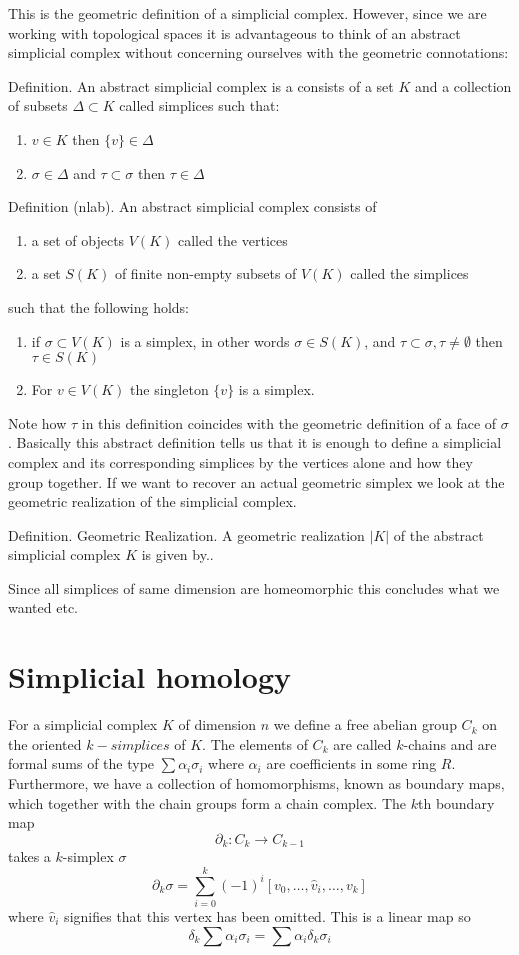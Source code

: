 This is the geometric definition of a simplicial complex. However, since we are working with topological spaces it is advantageous to think of an abstract simplicial complex without concerning ourselves with the geometric connotations:

Definition. An abstract simplicial complex is a consists of a set $K$ and a collection of subsets $\Delta \subset K$ called simplices such that:
\begin{enumerate}
        \item $v \in K$ then $\{v\} \in \Delta$
        \item $\sigma \in \Delta$ and $\tau \subset \sigma$ then $\tau \in \Delta$
\end{enumerate}

Definition (nlab). An abstract simplicial complex consists of
\begin{enumerate}
  \item a set of objects $V(K)$ called the vertices
        \item a set $S(K)$ of finite non-empty subsets of $V(K)$ called the simplices
\end{enumerate}
such that the following holds:
\begin{enumerate}
  \item if $\sigma \subset V(K)$ is a simplex, in other words $\sigma \in S(K)$, and $\tau \subset \sigma, \tau \neq \emptyset$ then $\tau \in S(K)$
        \item For $v \in V(K)$ the singleton $\{v\}$ is a simplex.
\end{enumerate}
Note how $\tau$ in this definition coincides with the geometric definition of a face of $\sigma$. Basically this abstract definition tells us that it is enough to define a simplicial complex and its corresponding simplices by the vertices alone and how they group together. If we want to recover an actual geometric simplex we look at the geometric realization of the simplicial complex.

Definition. Geometric Realization. A geometric realization $|K|$ of the abstract simplicial complex $K$ is given by..

Since all simplices of same dimension are homeomorphic this concludes what we wanted etc.
\section{Simplicial homology}
For a simplicial complex $K$ of dimension $n$ we define a free abelian group $C_{k}$ on the oriented $k-simplices$ of $K$.
The elements of $C_{k}$ are called $k$-chains and are formal sums of the type
$\sum \alpha_{i} \sigma_{i}$
where $\alpha_{i}$ are coefficients in some ring $R$. Furthermore, we have a collection of homomorphisms, known as boundary maps, which together with the chain groups form a chain complex. The $k$th boundary map
\[ \partial_{k}: C_{k} \to C_{k-1}\]
takes a $k$-simplex $\sigma$
\[ \partial_{k} \sigma = \sum^{k}_{{i=0}} (-1)^{i} [v_{0},\dots,\hat v_{i}, \dots, v_{k}]\]
where $\hat v_{i}$ signifies that this vertex has been omitted. This is a linear map so
\[\delta_{k} \sum \alpha_{i}\sigma_{i} = \sum \alpha_{i} \delta_{k} \sigma_{i}\]

